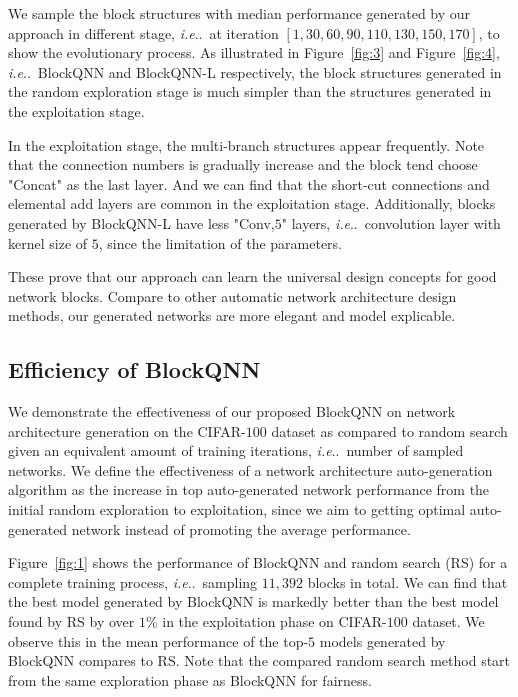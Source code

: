 \documentclass[10pt,journal,compsoc]{IEEEtran}
\makeatletter
\DeclareRobustCommand\onedot{\futurelet\@let@token\@onedot}
\def\@onedot{\ifx\@let@token.\else.\null\fi\xspace}
\def\ie{\emph{i.e}\onedot} \def\Ie{\emph{I.e}\onedot}
\makeatother
\begin{document}
We sample the block structures with median performance generated by our approach in different stage, \ie~at iteration $[1, 30, 60, 90, 110, 130, 150, 170]$, to show the evolutionary process. As illustrated in Figure~\ref{fig:3} and Figure~\ref{fig:4}, \ie~BlockQNN and BlockQNN-L respectively, the block structures generated in the random exploration stage is much simpler than the structures generated in the exploitation stage.

In the exploitation stage, the multi-branch structures appear frequently. Note that the connection numbers is gradually increase and the block tend choose "Concat" as the last layer. And we can find that the short-cut connections and elemental add layers are common in the exploitation stage. Additionally, blocks generated by BlockQNN-L have less "Conv,$5$" layers, \ie~convolution layer with kernel size of $5$, since the limitation of the parameters.


These prove that our approach can learn the universal design concepts for good network blocks. Compare to other automatic network architecture design methods, our generated networks are more elegant and model explicable.



\subsection{Efficiency of BlockQNN}



We demonstrate the effectiveness of our proposed BlockQNN on network architecture generation on the CIFAR-$100$ dataset as compared to random search given an equivalent amount of training iterations, \ie~number of sampled networks. We define the effectiveness of a network architecture auto-generation algorithm as the increase in top auto-generated network performance from the initial random exploration to exploitation, since we aim to getting optimal auto-generated network instead of promoting the average performance. 


Figure~\ref{fig:1} shows the performance of BlockQNN and random search (RS) for a complete training process, \ie~sampling $11, 392$ blocks in total. We can find that the best model generated by BlockQNN is markedly better than the best model found by RS by over $1\%$ in the exploitation phase on CIFAR-$100$ dataset. We observe this in the mean performance of the top-$5$ models generated by BlockQNN compares to RS. Note that the compared random search method start from the same exploration phase as BlockQNN for fairness.
\end{document}

